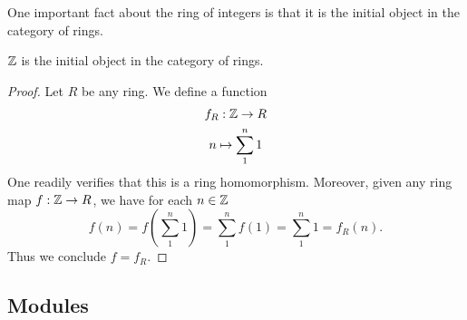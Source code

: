         One important fact about the ring of integers is that it is the initial object in the category of rings.
    \begin{lemma}
        $\mathbb{Z}$ is the initial object in the category of rings.
    \end{lemma}
    \begin{proof}
        Let $R$ be any ring. We define a function
        \begin{gather*}
            f_R : \mathbb{Z} \rightarrow R\\
            n \mapsto \sum_1^n 1
        \end{gather*}
        One readily verifies that this is a ring homomorphism. Moreover, given any ring map $f:\mathbb{Z} \rightarrow R$, we have for each $n\in \mathbb{Z}$ 
        $$
            f(n) = f\left(\sum_1^n 1\right) = \sum_1^n f(1)= \sum_1^n 1 = f_R(n).
        $$
        Thus we conclude $f= f_R$.
    \end{proof}
\subsection{Modules}
